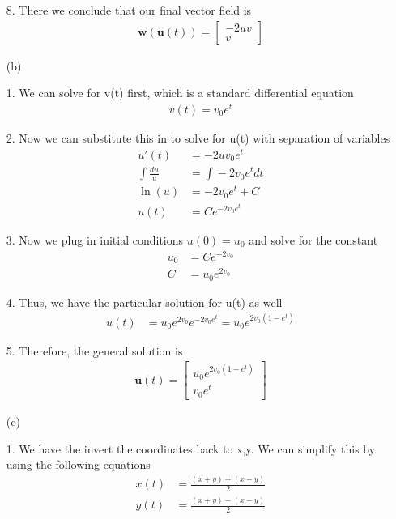 \documentclass[12pt]{article}
\begin{document}
\begin{enumerate}
        8. There we conclude that our final vector field is
        \begin{align*}
          \mathbf{w}(\mathbf{u}(t)) = \begin{bmatrix} -2uv \\ v \end{bmatrix}
        \end{align*}

  \item [(b)]

        1. We can solve for v(t) first, which is a standard differential equation
        \begin{align*}
          v(t) = v_0e^t
        \end{align*}

        2. Now we can substitute this in to solve for u(t) with separation of variables
        \begin{align*}
          u'(t)              & = -2uv_0e^t         \\
          \int{}\frac{du}{u} & = \int{}-2v_0e^t dt \\
          \ln(u)             & = -2v_0e^t + C      \\
          u(t)               & = Ce^{-2v_0e^t}
        \end{align*}

        3. Now we plug in initial conditions $u(0) = u_0$ and solve for the constant
        \begin{align*}
          u_0 & = Ce^{-2v_0}  \\
          C   & = u_0e^{2v_0}
        \end{align*}

        4. Thus, we have the particular solution for u(t) as well
        \begin{align*}
          u(t) & = u_0e^{2v_0}e^{-2v_0e^t} = u_0e^{2v_0(1-e^t)}
        \end{align*}

        5. Therefore, the general solution is
        \begin{align*}
          \mathbf{u}(t) = \begin{bmatrix}   u_0e^{2v_0(1-e^t)} \\ v_0e^t       \end{bmatrix}
        \end{align*}

  \item[(c)]

        1. We have the invert the coordinates back to x,y. We can simplify this by using the following equations
        \begin{align*}
          x(t) & = \frac{(x+y)+(x-y)}{2} \\
          y(t) & = \frac{(x+y)-(x-y)}{2}
        \end{align*}


\end{enumerate}
\end{document}
